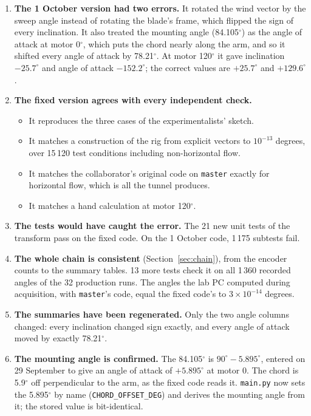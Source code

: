 \documentclass[11pt]{article}
\newcommand{\code}[1]{\texttt{#1}}
\begin{document}
\begin{enumerate}
  \item \textbf{The 1 October version had two errors.} It rotated the wind
        vector by the sweep angle instead of rotating the blade's frame,
        which flipped the sign of every inclination. It also treated the
        mounting angle (84.105$^\circ$) as the angle of attack at motor
        0$^\circ$, which puts the chord nearly along the arm, and so it shifted
        every angle of attack by 78.21$^\circ$. At motor 120$^\circ$ it gave
        inclination $-25.7^\circ$ and angle of attack $-152.2^\circ$; the
        correct values are $+25.7^\circ$ and $+129.6^\circ$.
  \item \textbf{The fixed version agrees with every independent check.}
        \begin{itemize}
          \item It reproduces the three cases of the experimentalists' sketch.
          \item It matches a construction of the rig from explicit vectors
                to $10^{-13}$ degrees, over 15\,120 test conditions including
                non-horizontal flow.
          \item It matches the collaborator's original code on
                \code{master} exactly for horizontal flow, which is all the
                tunnel produces.
          \item It matches a hand calculation at motor 120$^\circ$.
        \end{itemize}
  \item \textbf{The tests would have caught the error.} The 21 new unit tests
        of the transform pass on the fixed code. On the 1 October code,
        1\,175 subtests fail.
  \item \textbf{The whole chain is consistent} (Section~\ref{sec:chain}),
        from the encoder counts to the summary tables. 13 more tests check it
        on all 1\,360 recorded angles of the 32 production runs. The angles
        the lab PC computed during acquisition, with \code{master}'s code,
        equal the fixed code's to $3\times10^{-14}$ degrees.
  \item \textbf{The summaries have been regenerated.} Only the two angle
        columns changed: every inclination changed sign exactly, and every
        angle of attack moved by exactly 78.21$^\circ$.
  \item \textbf{The mounting angle is confirmed.} The 84.105$^\circ$ is
        $90^\circ - 5.895^\circ$, entered on 29 September to give an angle of
        attack of $+5.895^\circ$ at motor 0. The chord is 5.9$^\circ$ off
        perpendicular to the arm, as the fixed code reads it. \code{main.py}
        now sets the 5.895$^\circ$ by name (\code{CHORD\_OFFSET\_DEG}) and
        derives the mounting angle from it; the stored value is
        bit-identical.
\end{enumerate}
\end{document}
